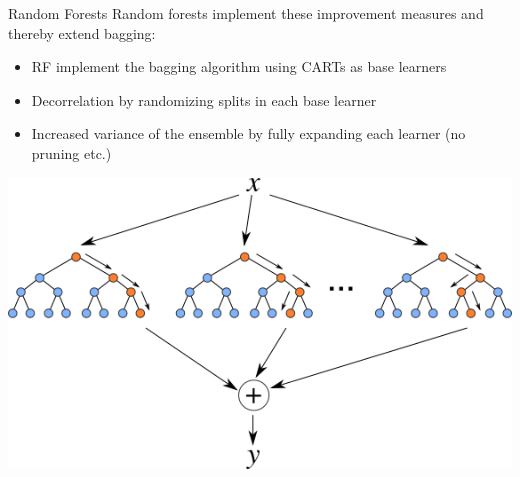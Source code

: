 \documentclass[11pt,compress,t,notes=noshow, xcolor=table]{beamer}
\begin{document}
\begin{vbframe}{Random Forests}
Random forests implement these improvement measures and thereby extend bagging:
\begin{itemize}
  \item RF implement the bagging algorithm using CARTs as base learners
  \item Decorrelation by randomizing splits in each base learner
  \item Increased variance of the ensemble by fully expanding each learner (no pruning etc.)
\end{itemize}
\begin{center}
\includegraphics[height=0.4\textheight, keepaspectratio]{figure_man/forest.png}
\end{center}
\end{vbframe}


\endlecture
\end{document}
